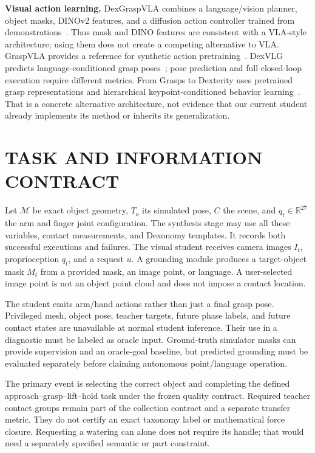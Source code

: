 \documentclass[letterpaper, 10 pt, conference]{ieeeconf}
\begin{document}
\textbf{Visual action learning.}
DexGraspVLA combines a language/vision planner, object masks, DINOv2 features,
and a diffusion action controller trained from demonstrations~\cite{dexgraspvla}.
Thus mask and DINO features are consistent with a VLA-style architecture;
using them does not create a competing alternative to VLA. GraspVLA provides a
reference for synthetic action pretraining~\cite{graspvla}. DexVLG predicts
language-conditioned grasp poses~\cite{dexvlg}; pose prediction and full
closed-loop execution require different metrics.
From Grasps to Dexterity uses pretrained grasp representations and hierarchical
keypoint-conditioned behavior learning~\cite{fromgraspstodexterity}. That is a
concrete alternative architecture, not evidence that our current student already
implements its method or inherits its generalization.

\section{TASK AND INFORMATION CONTRACT}
Let $\mathcal{M}$ be exact object geometry, $T_o$ its simulated pose, $C$ the
scene, and $q_t\in\mathbb{R}^{27}$ the arm and finger joint configuration.
The synthesis stage may use all these variables, contact measurements, and
Dexonomy templates. It records both successful executions and failures.
The visual student receives camera images $I_t$, proprioception $q_t$, and a
request $u$. A grounding module produces a target-object mask $M_t$ from a
provided mask, an image point, or language. A user-selected image point is not
an object point cloud and does not impose a contact location.

The student emits arm/hand actions rather than just a final grasp pose.
Privileged mesh, object pose, teacher targets, future phase labels, and future
contact states are unavailable at normal student inference. Their use in a
diagnostic must be labeled as oracle input. Ground-truth simulator masks can
provide supervision and an oracle-goal baseline, but predicted grounding must
be evaluated separately before claiming autonomous point/language operation.

The primary event is selecting the correct object and completing the defined
approach--grasp--lift--hold task under the frozen quality contract. Required
teacher contact groups remain part of the collection contract and a separate
transfer metric. They do not certify an exact taxonomy label or mathematical
force closure. Requesting a watering can alone does not require its handle;
that would need a separately specified semantic or part constraint.
\end{document}
